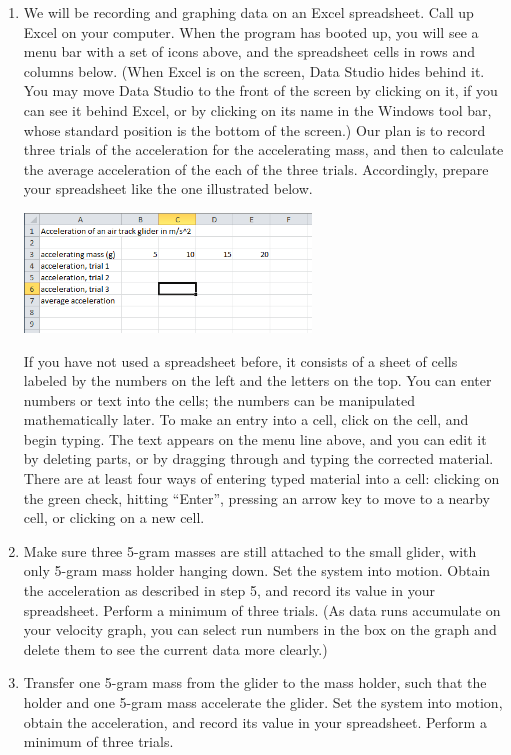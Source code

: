 \begin{enumerate}[label=\arabic*.]
\item We will be recording and graphing data on an Excel spreadsheet.  Call up Excel on your computer.  When the program has booted up, you will see a menu bar with a set of icons above, and the spreadsheet cells in rows and columns below.  (When Excel is on the screen, Data Studio hides behind it.  You may move Data Studio to the front of the screen by clicking on it, if you can see it behind Excel, or by clicking on its name in the Windows tool bar, whose standard position is the bottom of the screen.)  Our plan is to record three trials of the acceleration for the accelerating mass, and then to calculate the average acceleration of the each of the three trials.  Accordingly, prepare your spreadsheet like the one illustrated below.
\begin{center} \includegraphics*[width=0.6\textwidth]{imgs/6labs/6Alab/6Aexp3/6A_exp3_Excel_Spreadsheet1.png} \end{center}

If you have not used a spreadsheet before, it consists of a sheet of cells labeled by the numbers on the left and the letters on the top.  You can enter numbers or text into the cells; the numbers can be manipulated mathematically later.  To make an entry into a cell, click on the cell, and begin typing.  The text appears on the menu line above, and you can edit it by deleting parts, or by dragging through and typing the corrected material.  There are at least four ways of entering typed material into a cell: clicking on the green check, hitting ``Enter'', pressing an arrow key to move to a nearby cell, or clicking on a new cell.

\item 
Make sure three 5-gram masses are still attached to the small glider, with only 5-gram mass holder hanging down.
Set the system into motion.  Obtain the acceleration as described in step 5, and record its value in your spreadsheet.  Perform a minimum of three trials.  (As data runs accumulate on your velocity graph, you can select run numbers in the box on the graph and delete them to see the current data more clearly.)

\item Transfer one 5-gram mass from the glider to the mass holder, such that the holder and one 5-gram mass accelerate the glider.  Set the system into motion, obtain the acceleration, and record its value in your spreadsheet.  Perform a minimum of three trials.


\end{enumerate}
